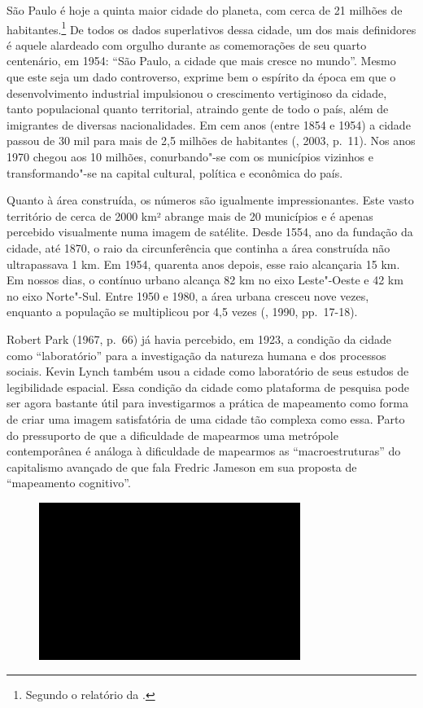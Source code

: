 São Paulo é hoje a quinta maior cidade do planeta, com cerca de 21
milhões de habitantes.\footnote{Segundo o relatório da  {}.} De todos os dados superlativos dessa cidade,
um dos mais definidores é aquele alardeado com orgulho durante as
comemorações de seu quarto centenário, em 1954: ``São Paulo, a cidade
que mais cresce no mundo''. Mesmo que este seja um dado controverso,
exprime bem o espírito da época em que o desenvolvimento industrial
impulsionou o crescimento vertiginoso da cidade, tanto populacional
quanto territorial, atraindo gente de todo o país, além de imigrantes de
diversas nacionalidades. Em cem anos (entre 1854 e 1954) a cidade passou
de 30 mil para mais de 2,5 milhões de habitantes (, 2003, p.~11).
Nos anos 1970 chegou aos 10 milhões, conurbando"-se com os municípios
vizinhos e transformando"-se na capital cultural, política e econômica do
país.

Quanto à área construída, os números são igualmente impressionantes.
Este vasto território de cerca de 2000 km² abrange mais de 20 municípios
e é apenas percebido visualmente numa imagem de satélite. Desde 1554,
ano da fundação da cidade, até 1870, o raio da circunferência que
continha a área construída não ultrapassava 1 km. Em 1954, quarenta anos
depois, esse raio alcançaria 15 km. Em nossos dias, o contínuo urbano
alcança 82 km no eixo Leste"-Oeste e 42 km no eixo Norte"-Sul. Entre 1950
e 1980, a área urbana cresceu nove vezes, enquanto a população se
multiplicou por 4,5 vezes (, 1990, pp.~17-18).

Robert Park (1967, p.~66) já havia percebido, em 1923, a condição da
cidade como ``laboratório'' para a investigação da natureza humana e dos
processos sociais. Kevin Lynch também usou a cidade como laboratório de
seus estudos de legibilidade espacial. Essa condição da cidade como
plataforma de pesquisa pode ser agora bastante útil para investigarmos a
prática de mapeamento como forma de criar uma imagem satisfatória de uma
cidade tão complexa como essa. Parto do pressuporto de que a dificuldade
de mapearmos uma metrópole contemporânea é análoga à dificuldade de
mapearmos as ``macroestruturas'' do capitalismo avançado de que fala
Fredric Jameson em sua proposta de ``mapeamento cognitivo''.

\begin{figure}[!ht]

\centering
 \includegraphics[width=85mm]{./imgs/im1.jpg}
\caption{\tiny{}}

\end{figure}

